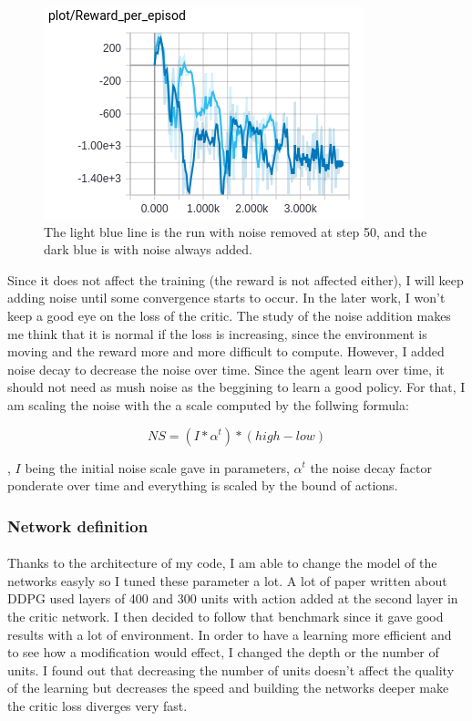 \documentclass{article}
\begin{document}
\begin{figure}[ht]
  \centering
  \includegraphics[width=.5\textwidth]{noise_cancellation}
  \caption{The light blue line is the run with noise removed at step 50, and the
  dark blue is with noise always added.}
  \label{fig:noise_cancellation}
\end{figure}

Since it does not affect the training (the reward is not affected either), I
will keep adding noise until some convergence starts to occur. In the later
work, I won't keep a good eye on the loss of the critic. The study of the noise
addition makes me think that it is normal if the loss is increasing, since the
environment is moving and the reward more and more difficult to compute.
However, I added noise decay to decrease the noise over time. Since the agent
learn over time, it should not need as mush noise as the beggining to learn a
good policy. For that, I am scaling the noise with the a scale computed by the
follwing formula:

\begin{equation}
NS = (I * \alpha^{t}) * (high - low) 
\end{equation}

, $I$ being the initial noise scale gave in parameters, $\alpha^{t}$ the noise
decay factor ponderate over time and everything is scaled by the bound of
actions.

\subsubsection{Network definition} 

\paragraph{}
Thanks to the architecture of my code, I am able to change the model of the networks easyly so I
tuned these parameter a lot. A lot of paper written about DDPG \cite{journals/corr/LillicrapHPHETS15}
\cite{DBLP:journals/corr/abs-1801-10425} used layers of 400 and 300 units with action added at the second
layer in the critic network. I then decided to follow that benchmark since it gave good results with
a lot of environment. In order to have a learning more efficient and to see how a modification would effect,
I changed the depth or the number of units. I found out that decreasing the number of units doesn't affect
the quality of the learning but decreases the speed and building the networks deeper make the critic loss
diverges very fast.
\end{document}
